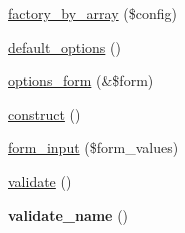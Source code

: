 \begin{CompactItemize}
\item 
\hyperlink{classflag__flag_5212e58986627780a60f9d4e03561519}{factory\_\-by\_\-array} (\$config)
\item 
\hyperlink{classflag__flag_240678d55d61a16ef848ecc0cc3c609f}{default\_\-options} ()
\item 
\hyperlink{classflag__flag_28aec91da5bc068c6c2a9a707ef62345}{options\_\-form} (\&\$form)
\item 
\hyperlink{classflag__flag_e3ae686e7c5f00620609bb1761c1e00b}{construct} ()
\item 
\hyperlink{classflag__flag_9e651600ce67f547b629605f38183f2b}{form\_\-input} (\$form\_\-values)
\item 
\hyperlink{classflag__flag_3798da6a05ea42660d511af1421a687f}{validate} ()
\item 
\hypertarget{classflag__flag_025e056b3198738d52853bfde98fe5d7}{
\textbf{validate\_\-name} ()}
\label{classflag__flag_025e056b3198738d52853bfde98fe5d7}


\end{CompactItemize}
